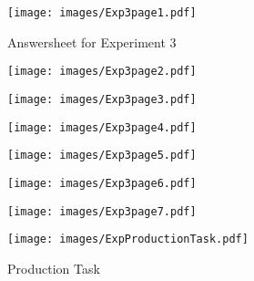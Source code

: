 \begin{figure}
	\centering
		\texttt{[image: images/Exp3page1.pdf]}
		\caption{Answersheet for Experiment 3}
			\label{x3p1}
\end{figure}

\begin{figure}
	\centering
		\texttt{[image: images/Exp3page2.pdf]}
		\label{x3p2}
\end{figure}

\begin{figure}
	\centering
		\texttt{[image: images/Exp3page3.pdf]}
		\label{x3p3}
\end{figure}

\begin{figure}
	\centering
		\texttt{[image: images/Exp3page4.pdf]}
		\label{x3p4}
\end{figure}

\begin{figure}
	\centering
		\texttt{[image: images/Exp3page5.pdf]}
		\label{x3p5}
\end{figure}

\begin{figure}
	\centering
		\texttt{[image: images/Exp3page6.pdf]}
		\label{x3p6}
\end{figure}

\begin{figure}
	\centering
		\texttt{[image: images/Exp3page7.pdf]}
		\label{x3p7}
\end{figure}



\begin{figure}[htbp]
	\centering
		\texttt{[image: images/ExpProductionTask.pdf]}
	\caption{Production Task}
	\label{fig:ExpProductionTask}
\end{figure}





